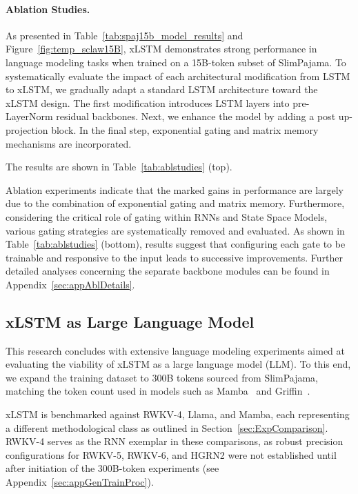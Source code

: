 \paragraph{Ablation Studies.}
As presented in Table~\ref{tab:spaj15b_model_results} and Figure~\ref{fig:temp_sclaw15B}, xLSTM demonstrates strong performance in language modeling tasks when trained on a 15B-token subset of SlimPajama. To systematically evaluate the impact of each architectural modification from LSTM to xLSTM, we gradually adapt a standard LSTM architecture toward the xLSTM design. The first modification introduces LSTM layers into pre-LayerNorm residual backbones. Next, we enhance the model by adding a post up-projection block. In the final step, exponential gating and matrix memory mechanisms are incorporated.

The results are shown in Table~\ref{tab:ablstudies} (top). 

Ablation experiments indicate that the marked gains in performance are largely due to the combination of exponential gating and matrix memory. Furthermore, considering the critical role of gating within RNNs and State Space Models, various gating strategies are systematically removed and evaluated. As shown in Table~\ref{tab:ablstudies} (bottom), results suggest that configuring each gate to be trainable and responsive to the input leads to successive improvements. Further detailed analyses concerning the separate backbone modules can be found in Appendix~\ref{sec:appAblDetails}.

\subsection{xLSTM as Large Language Model}
\label{sec:ExpLanguage}

This research concludes with extensive language modeling experiments aimed at evaluating the viability of xLSTM as a large language model (LLM). To this end, we expand the training dataset to 300B tokens sourced from SlimPajama, matching the token count used in models such as Mamba~\citep{Gu:24arxiv} and Griffin~\citep{De:24arxiv}.

xLSTM is benchmarked against RWKV-4, Llama, and Mamba, each representing a different methodological class as outlined in Section~\ref{sec:ExpComparison}. RWKV-4 serves as the RNN exemplar in these comparisons, as robust precision configurations for RWKV-5, RWKV-6, and HGRN2 were not established until after initiation of the 300B-token experiments (see Appendix~\ref{sec:appGenTrainProc}).

